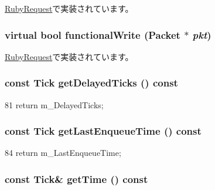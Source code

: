 \hyperlink{classRubyRequest_a729f57f557bb42c045c47d9388f1030e}{RubyRequest}で実装されています。\hypertarget{classMessage_a1a7af86f43fb867628a3c3cf76e4dcc9}{
\subsubsection[{functionalWrite}]{\setlength{\rightskip}{0pt plus 5cm}virtual bool functionalWrite ({\bf Packet} $\ast$ {\em pkt})}}
\label{classMessage_a1a7af86f43fb867628a3c3cf76e4dcc9}


\hyperlink{classRubyRequest_a14bf46f4c6bb79e5357096af6b9dbffa}{RubyRequest}で実装されています。\hypertarget{classMessage_a63c73b634cea513a93c8379b8973e1ba}{
\subsubsection[{getDelayedTicks}]{\setlength{\rightskip}{0pt plus 5cm}const {\bf Tick} getDelayedTicks () const}}
\label{classMessage_a63c73b634cea513a93c8379b8973e1ba}



\begin{DoxyCode}
81 {return m_DelayedTicks;}
\end{DoxyCode}
\hypertarget{classMessage_adbfd7f03977545143ecdcd4fef0f1d65}{
\subsubsection[{getLastEnqueueTime}]{\setlength{\rightskip}{0pt plus 5cm}const {\bf Tick} getLastEnqueueTime () const}}
\label{classMessage_adbfd7f03977545143ecdcd4fef0f1d65}



\begin{DoxyCode}
84 {return m_LastEnqueueTime;}
\end{DoxyCode}
\hypertarget{classMessage_ad72f25ef5dc38c31b1f0c095d5796426}{
\subsubsection[{getTime}]{\setlength{\rightskip}{0pt plus 5cm}const {\bf Tick}\& getTime () const}}
\label{classMessage_ad72f25ef5dc38c31b1f0c095d5796426}



